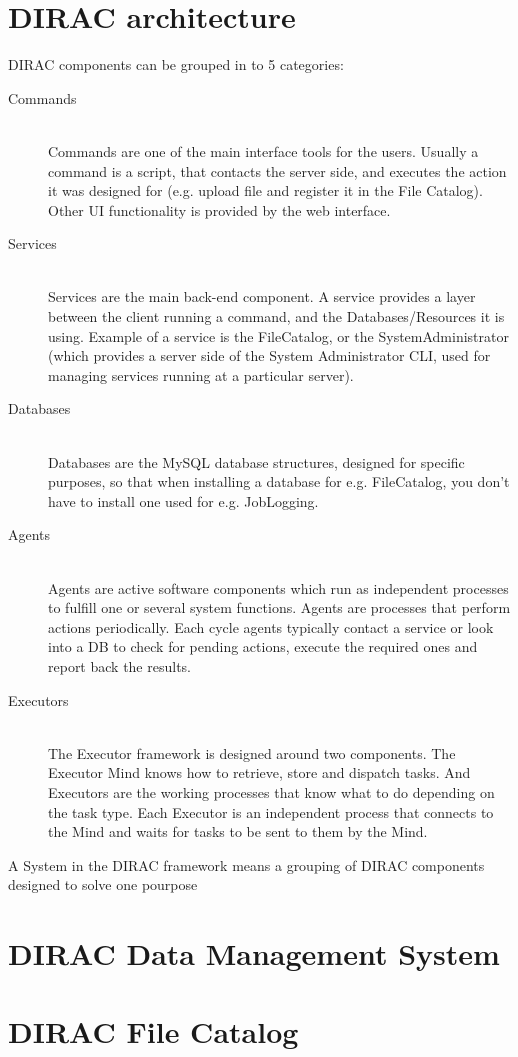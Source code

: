 \section{DIRAC architecture}
DIRAC components can be grouped in to 5 categories: 
\begin{description}

\item[Commands] \hfill \\
Commands are one of the main interface tools for the users. Usually a command is a script, that contacts the server
side, and executes the action it was designed for (e.g. upload file and register it in the File Catalog). Other UI
functionality is provided by the web interface.

\item[Services] \hfill \\
Services are the main back-end component. A service provides a layer between the client running a command, and the
Databases/Resources it is using. Example of a service is the FileCatalog, or the SystemAdministrator (which provides
a server side of the System Administrator CLI, used for managing services running at a particular server).

\item[Databases] \hfill \\
Databases are the MySQL database structures, designed for specific purposes, so that when installing a database for
e.g. FileCatalog, you don't have to install one used for e.g. JobLogging.

\item[Agents] \hfill \\
Agents are active software components which run as independent processes to fulfill one or several system functions.
Agents are processes that perform actions periodically. Each cycle agents typically contact a service or look into a
DB to check for pending actions, execute the required ones and report back the results. 

\item[Executors] \hfill \\
The Executor framework is designed around two components. The Executor Mind knows how to retrieve, store and dispatch
tasks. And Executors are the working processes that know what to do depending on the task type. Each Executor is an
independent process that connects to the Mind and waits for tasks to be sent to them by the Mind.
\end{description}

A System in the DIRAC framework means a grouping of DIRAC components designed to solve one pourpose

\section{DIRAC Data Management System}


\section{DIRAC File Catalog}
